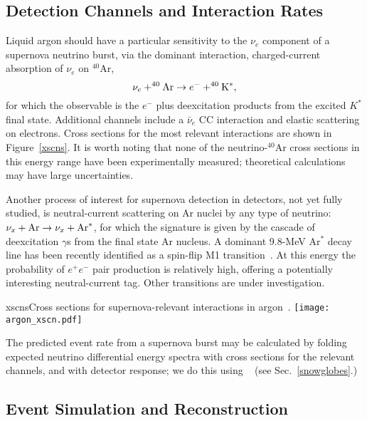 \subsection{Detection Channels and Interaction Rates}

Liquid argon should have a particular sensitivity to the $\nu_e$
component of a supernova neutrino burst, via the dominant interaction,
charged-current
absorption of $\nu_e$ on $^{40}$Ar,
\begin{equation}
\nu_e + ^{40}{\rm Ar} \rightarrow e^- + ^{40}{\rm K^*},
\label{eq:nueabs}
\end{equation}
for which the observable is the $e^-$ plus deexcitation products from
the excited $K^*$ final state.  Additional channels include a
$\bar{\nu}_e$ CC interaction and elastic scattering on electrons.
Cross sections for the most
relevant interactions are shown in Figure~\ref{xscns}.  It is worth
noting that none of the neutrino-$^{40}$Ar cross sections in this
energy range have been experimentally measured; theoretical
calculations may have large uncertainties.

Another process of interest for supernova detection in  detectors,
not yet fully studied,  is neutral-current  scattering on Ar nuclei by
any type of neutrino: $\nu_x + {\rm Ar} \rightarrow \nu_x + {\rm
  Ar}^*$,  for which the signature is given by the cascade of
deexcitation $\gamma$s from the final state Ar nucleus.  A dominant
9.8-MeV Ar$^*$ decay line has been recently identified as a spin-flip
M1 transition~\cite{Hayes}.   At this energy the probability of
$e^+e^-$ pair production is relatively high, offering a potentially
interesting neutral-current tag.  Other transitions are under investigation.


\begin{dunefigure}{xscns}{Cross sections for supernova-relevant interactions in argon~\cite{snowglobes,GilBotella:2003sz}.}
\texttt{[image: argon\_xscn.pdf]}
\end{dunefigure}

The predicted event rate from a supernova burst may be calculated by
folding expected neutrino differential energy spectra with cross
sections for the relevant channels, and with detector response; we do
this using ~\cite{snowglobes} (see Sec.~\ref{snowglobes}.)


\subsection{Event Simulation and Reconstruction}

